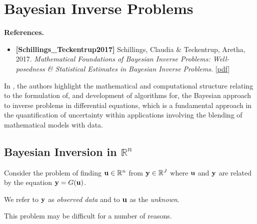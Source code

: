 \documentclass[oneside]{article}
\numberwithin{equation}{section}
\begin{document}
\section{Bayesian Inverse Problems}
\textbf{References.}
\begin{itemize}
    \item \textbf{[Schillings\_Teckentrup2017]} Schillings, Claudia \& Teckentrup, Aretha,
    2017. \textit{Mathematical Foundations of Bayesian Inverse Problems: Well-posedness \& Statistical Estimates in Bayesian Inverse Problems}. [\href{https://github.com/NQBH/reference/blob/master/Schillings_Teckentrup2017_part_1.pdf}{pdf}]
\end{itemize}
In \cite{Dashti_Stuart2017}, the authors highlight the mathematical and computational structure relating to the formulation of, and development of algorithms for, the Bayesian approach to inverse problems in differential equations, which is a fundamental approach in the quantification of uncertainty within applications involving the blending of mathematical models with data.

\subsection{Bayesian Inversion in $\mathbb{R}^n$}
Consider the problem of finding ${\bf u}\in\mathbb{R}^n$ from ${\bf y}\in\mathbb{R}^J$ where ${\bf u}$ and ${\bf y}$ are related by the equation ${\bf y} = G({\bf u})$.

We refer to ${\bf y}$ as \textit{observed data} and to ${\bf u}$ as the \textit{unknown}.

This problem may be difficult for a number of reasons.
\end{document}
